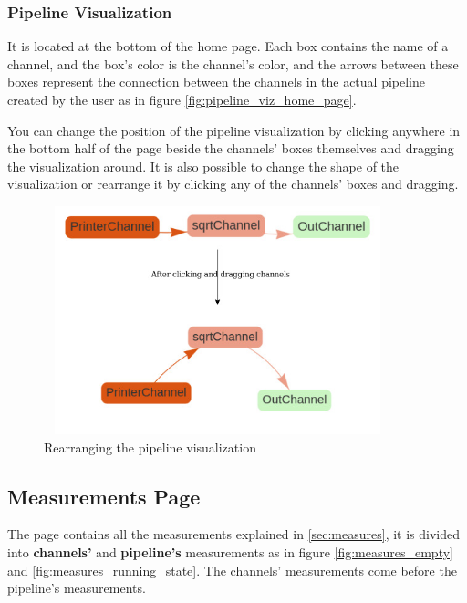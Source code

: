 \subsubsection{Pipeline Visualization}
It is located at the bottom of the home page. Each box contains the name of a channel, and the box's color is the
channel's color, and the arrows between these boxes represent the connection between the channels in the
actual pipeline created by the user as in figure \ref{fig:pipeline_viz_home_page}.

You can change the position of the pipeline visualization by clicking anywhere in the bottom half of the page
beside the channels' boxes themselves and dragging the visualization around. It is also possible to change the 
shape of the visualization or rearrange it by clicking any of the channels' boxes and dragging.
\newline
\begin{figure}[H]
	\centering
	\includegraphics[width=0.9\textwidth,height=250px]{images/moving_viz_graph.jpg}
	\caption{Rearranging the pipeline visualization}
	\label{fig:remving_channel_graph}
\end{figure}

\subsection{Measurements Page}
The page contains all the measurements explained in \ref{sec:measures}, it is divided into \textbf{channels'} and
\textbf{pipeline's} measurements as in figure \ref{fig:measures_empty} and \ref{fig:measures_running_state}. The
channels' measurements come before the pipeline's measurements.

